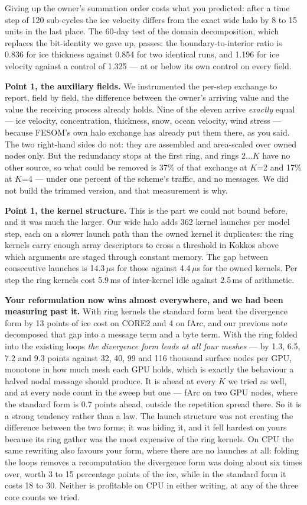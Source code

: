 \documentclass[10pt,a4paper]{article}
\begin{document}
Giving up the owner's summation order costs what you predicted: after a time step of 120
sub-cycles the ice velocity differs from the exact wide halo by 8 to 15 units in the last place.
The 60-day test of the domain decomposition, which replaces the bit-identity we gave up, passes:
the boundary-to-interior ratio is 0.836 for ice thickness against 0.854 for two identical runs, and
1.196 for ice velocity against a control of 1.325 --- at or below its own control on every field.

\textbf{Point 1, the auxiliary fields.} We instrumented the per-step exchange to report, field by
field, the difference between the owner's arriving value and the value the receiving process
already holds. Nine of the eleven arrive \emph{exactly} equal --- ice velocity, concentration,
thickness, snow, ocean velocity, wind stress --- because FESOM's own halo exchange has already put
them there, as you said. The two right-hand sides do not: they are assembled and area-scaled over
owned nodes only. But the redundancy stops at the first ring, and rings $2\ldots K$ have no other
source, so what could be removed is 37\% of that exchange at $K$=2 and 17\% at $K$=4 --- under one
percent of the scheme's traffic, and no messages. We did not build the trimmed version, and that
measurement is why.

\textbf{Point 1, the kernel structure.} This is the part we could not bound before, and it was
much the larger. Our wide halo adds 362 kernel launches per model step, each on a slower launch
path than the owned kernel it duplicates: the ring kernels carry enough array descriptors to cross
a threshold in Kokkos above which arguments are staged through constant memory. The gap between
consecutive launches is 14.3\,$\mu$s for those against 4.4\,$\mu$s for the owned kernels. Per step
the ring kernels cost 5.9\,ms of inter-kernel idle against 2.5\,ms of arithmetic.

\textbf{Your reformulation now wins almost everywhere, and we had been measuring past it.} With ring
kernels the standard form beat the divergence form by 13 points of ice cost on CORE2 and 4 on
fArc, and our previous note decomposed that gap into a message term and a byte term. With the ring
folded into the existing loops \emph{the divergence form leads at all four meshes} --- by 1.3,
6.5, 7.2 and 9.3 points against 32, 40, 99 and 116 thousand surface nodes per GPU, monotone in how
much mesh each GPU holds, which is exactly the behaviour a halved nodal message should produce. It is ahead at every $K$ we tried as well, and at every node count in the
sweep but one --- fArc on two GPU nodes, where the standard form is 0.7 points ahead, outside the
repetition spread there. So it is a strong tendency rather than a law. The launch structure was not
creating the difference between the two forms; it was hiding it, and it fell hardest on yours
because its ring gather was the most expensive of the ring kernels. On CPU the same rewriting also
favours your form, where there are no launches at all: folding the loops removes a recomputation
the divergence form was doing about six times over, worth 3 to 15 percentage points of the ice,
while in the standard form it costs 18 to 30. Neither is profitable on CPU in either writing, at
any of the three core counts we tried.
\end{document}

